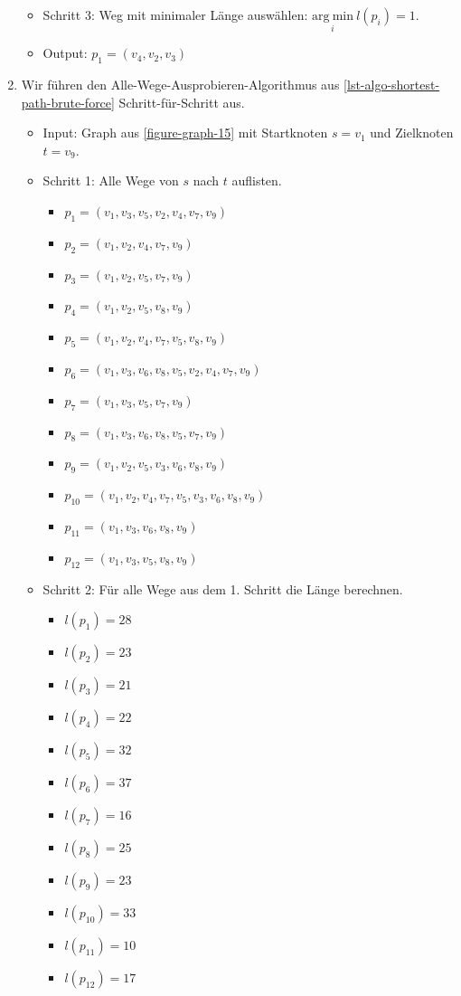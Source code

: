 \begin{enumerate}
\begin{itemize}
\item Schritt 3: Weg mit minimaler Länge auswählen: $\underset{i}{\mathrm{arg~min}}~l(p_i) = 1$.

\item Output: $p_{1} = (v_4, v_2, v_3)$

\end{itemize}

	\item Wir führen den Alle-Wege-Ausprobieren-Algorithmus aus \autoref{lst-algo-shortest-path-brute-force} Schritt-für-Schritt aus.	
\begin{itemize}
\item Input: Graph aus \autoref{figure-graph-15} mit Startknoten $s = v_1$ und Zielknoten $t = v_9$.
\item Schritt 1: Alle Wege von $s$ nach $t$ auflisten.

\begin{itemize}
\item $p_1 = (v_1,v_3,v_5,v_2,v_4,v_7,v_9)$
\item $p_2 = (v_1,v_2,v_4,v_7,v_9)$
\item $p_3 = (v_1,v_2,v_5,v_7,v_9)$
\item $p_4 = (v_1,v_2,v_5,v_8,v_9)$
\item $p_5 = (v_1,v_2,v_4,v_7,v_5,v_8,v_9)$
\item $p_6 = (v_1,v_3,v_6,v_8,v_5,v_2,v_4,v_7,v_9)$
\item $p_7 = (v_1,v_3,v_5,v_7,v_9)$
\item $p_8 = (v_1,v_3,v_6,v_8,v_5,v_7,v_9)$
\item $p_9 = (v_1,v_2,v_5,v_3,v_6,v_8,v_9)$
\item $p_{10} = (v_1,v_2,v_4,v_7,v_5,v_3,v_6,v_8,v_9)$
\item $p_{11} = (v_1,v_3,v_6,v_8,v_9)$
\item $p_{12} = (v_1,v_3,v_5,v_8,v_9)$
\end{itemize}

\item Schritt 2: Für alle Wege aus dem 1. Schritt die Länge berechnen.

\begin{itemize}
\item $l(p_1) = 28$
\item $l(p_2) = 23$
\item $l(p_3) = 21$
\item $l(p_4) = 22$
\item $l(p_5) = 32$
\item $l(p_6) = 37$
\item $l(p_7) = 16$
\item $l(p_8) = 25$
\item $l(p_9) = 23$
\item $l(p_{10}) = 33$
\item $l(p_{11}) = 10$
\item $l(p_{12}) = 17$
\end{itemize}


\end{itemize}
\end{enumerate}
